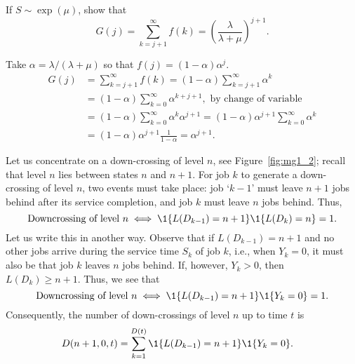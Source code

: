 \begin{exercise}
 If $S\sim \exp(\mu)$, show that 
  \begin{equation}
G(j) = \sum_{k=j+1}^\infty f(k) =  \left(\frac{\lambda}{\lambda+\mu}\right)^{j+1}.
  \end{equation}
\begin{solution}
  Take $\alpha = \lambda/(\lambda+\mu)$ so that
  $f(j) = (1-\alpha) \alpha^j$.
\begin{align*}
  G(j) 
&= \sum_{k=j+1}^\infty f(k)  = (1-\alpha) \sum_{k=j+1}^\infty \alpha^k \\
& = (1-\alpha) \sum_{k=0}^\infty \alpha^{k+j+1}, \text{ by change of variable}\\
& = (1-\alpha) \sum_{k=0}^\infty \alpha^{k}\alpha^{j+1}= (1-\alpha)\alpha^{j+1} \sum_{k=0}^\infty \alpha^k \\
&= (1-\alpha)\alpha^{j+1} \frac{1}{1-\alpha} = \alpha^{j+1}.
\end{align*}
    \end{solution}
\end{exercise}

Let us concentrate on a down-crossing of level $n$, see
Figure~\ref{fig:mg1_2}; recall that level $n$ lies between states $n$
and $n+1$. For job $k$ to generate a down-crossing of level $n$, two events must take place: 
 job `$k-1$' must leave $n+1$ jobs behind after its service completion, and  job $k$ must leave $n$ jobs behind. Thus, 
 \begin{equation*}
   \text{Downcrossing of level $n$} \iff \1{L(D_{k-1}) = n+1}\1{L(D_k)=n} = 1.
 \end{equation*}
Let us write this in another
way. Observe that if $L(D_{k-1})=n+1$ and no other jobs arrive during
the service time $S_k$ of job $k$, i.e., when $Y_k=0$, it must also be
that job $k$ leaves $n$ jobs behind. If, however, $Y_k>0$, then
$L(D_k)\geq n+1$.  Thus, we see that
 \begin{equation*}
   \text{Downcrossing of level $n$} \iff \1{L(D_{k-1}) = n+1}\1{Y_k=0} = 1.
 \end{equation*}
Consequently, the number of down-crossings of level $n$ up to time $t$ is
\begin{equation*}
  \begin{split}
  D(n+1, 0, t) 
&= \sum_{k=1}^{D(t)}\1{L(D_{k-1})=n+1}\1{Y_k=0}.
  \end{split}
\end{equation*}


